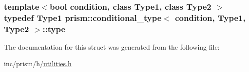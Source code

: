 \subsubsection[{\texorpdfstring{type}{type}}]{\setlength{\rightskip}{0pt plus 5cm}template$<$bool condition, class Type1, class Type2 $>$ typedef Type1 {\bf prism\+::conditional\+\_\+type}$<$ condition, Type1, Type2 $>$\+::{\bf type}}\hypertarget{structprism_1_1conditional__type_a9d57ba7c29ee017e38e49bbb72229b7e}{}\label{structprism_1_1conditional__type_a9d57ba7c29ee017e38e49bbb72229b7e}


The documentation for this struct was generated from the following file\+:\begin{DoxyCompactItemize}
\item 
inc/prism/h/\hyperlink{utilities_8h}{utilities.\+h}\end{DoxyCompactItemize}
